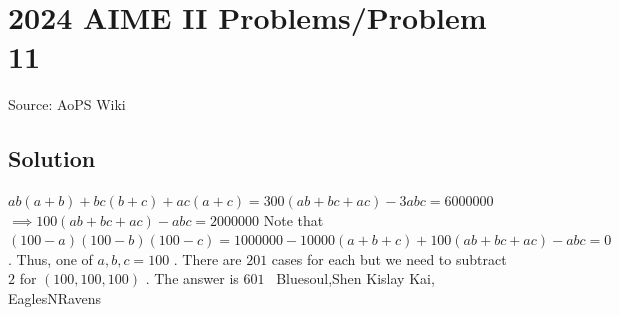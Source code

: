 \documentclass[12pt]{article}
\begin{document}
\section*{{2024 AIME II Problems/Problem 11}}
Source: AoPS Wiki

\subsection*{Solution}
$ab(a+b)+bc(b+c)+ac(a+c)=300(ab+bc+ac)-3abc=6000000$ $\implies 100(ab+bc+ac)-abc=2000000$ Note that $(100-a)(100-b)(100-c)=1000000-10000(a+b+c)+100(ab+bc+ac)-abc=0$ .
Thus, one of $a, b, c =100$ . There are $201$ cases for each but we need to subtract $2$ for $(100,100,100)$ . The answer is $\boxed{601}$ ~Bluesoul,Shen Kislay Kai, EaglesNRavens
\end{document}
